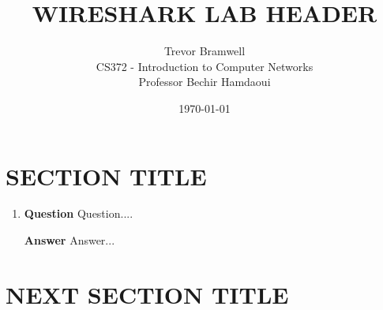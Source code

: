 \documentclass[12pt,letterpaper]{article}
\title{WIRESHARK LAB HEADER}
\author{
    Trevor Bramwell \\
    CS372 - Introduction to Computer Networks \\
    Professor Bechir Hamdaoui
}
\date{\today}
\newcommand{\q}{\textbf{Question} }
\newcommand{\ans}{\textbf{Answer} }
\begin{document}
\maketitle

\section{SECTION TITLE}
\begin{enumerate}
\item \q Question....

\ans Answer...
\end{enumerate}

\pagebreak
\pagebreak
\pagebreak

\section{NEXT SECTION TITLE}
\begin{enumerate}[resume]
\end{enumerate}
\end{document}

